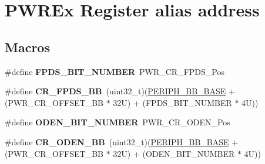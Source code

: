 \hypertarget{group___p_w_r_ex__register__alias__address}{}\section{P\+W\+R\+Ex Register alias address}
\label{group___p_w_r_ex__register__alias__address}
\subsection*{Macros}
\begin{DoxyCompactItemize}
\item 
\mbox{\label{group___p_w_r_ex__register__alias__address_gab04d9f278c4124285a9591c4f7098019}} 
\#define {\bfseries F\+P\+D\+S\+\_\+\+B\+I\+T\+\_\+\+N\+U\+M\+B\+ER}~P\+W\+R\+\_\+\+C\+R\+\_\+\+F\+P\+D\+S\+\_\+\+Pos
\item 
\mbox{\label{group___p_w_r_ex__register__alias__address_ga57d7041b5d1bf0ec94fa18152a7fa208}} 
\#define {\bfseries C\+R\+\_\+\+F\+P\+D\+S\+\_\+\+BB}~(uint32\+\_\+t)(\mbox{\hyperlink{group___peripheral__memory__map_gaed7efc100877000845c236ccdc9e144a}{P\+E\+R\+I\+P\+H\+\_\+\+B\+B\+\_\+\+B\+A\+SE}} + (P\+W\+R\+\_\+\+C\+R\+\_\+\+O\+F\+F\+S\+E\+T\+\_\+\+BB $\ast$ 32\+U) + (\+F\+P\+D\+S\+\_\+\+B\+I\+T\+\_\+\+N\+U\+M\+B\+E\+R $\ast$ 4\+U))
\item 
\mbox{\label{group___p_w_r_ex__register__alias__address_gace51402e8067c2b478e3bcbc6efe0b70}} 
\#define {\bfseries O\+D\+E\+N\+\_\+\+B\+I\+T\+\_\+\+N\+U\+M\+B\+ER}~P\+W\+R\+\_\+\+C\+R\+\_\+\+O\+D\+E\+N\+\_\+\+Pos
\item 
\mbox{\label{group___p_w_r_ex__register__alias__address_ga1ce2817ed3cc064b3577f90cbb23be35}} 
\#define {\bfseries C\+R\+\_\+\+O\+D\+E\+N\+\_\+\+BB}~(uint32\+\_\+t)(\mbox{\hyperlink{group___peripheral__memory__map_gaed7efc100877000845c236ccdc9e144a}{P\+E\+R\+I\+P\+H\+\_\+\+B\+B\+\_\+\+B\+A\+SE}} + (P\+W\+R\+\_\+\+C\+R\+\_\+\+O\+F\+F\+S\+E\+T\+\_\+\+BB $\ast$ 32\+U) + (\+O\+D\+E\+N\+\_\+\+B\+I\+T\+\_\+\+N\+U\+M\+B\+E\+R $\ast$ 4\+U))
\item 
\mbox{\label{group___p_w_r_ex__register__alias__address_gaedd8b85a6ee45b4816a46e7295525d50}} 

\end{DoxyCompactItemize}
